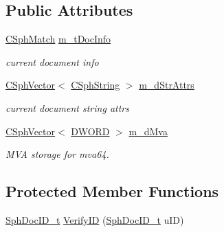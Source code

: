 \subsection*{Public Attributes}
\begin{DoxyCompactItemize}
\item 
\hyperlink{classCSphMatch}{C\-Sph\-Match} \hyperlink{classCSphSource_a78d0c67d1455c1a49267f79ab36a2d31}{m\-\_\-t\-Doc\-Info}
\begin{DoxyCompactList}\small\item\em current document info \end{DoxyCompactList}\item 
\hyperlink{classCSphVector}{C\-Sph\-Vector}$<$ \hyperlink{structCSphString}{C\-Sph\-String} $>$ \hyperlink{classCSphSource_ab504e862bb01cd4e5e755f2713a14234}{m\-\_\-d\-Str\-Attrs}
\begin{DoxyCompactList}\small\item\em current document string attrs \end{DoxyCompactList}\item 
\hyperlink{classCSphVector}{C\-Sph\-Vector}$<$ \hyperlink{sphinxstd_8h_a798af1e30bc65f319c1a246cecf59e39}{D\-W\-O\-R\-D} $>$ \hyperlink{classCSphSource_a15249c45e1ca278d76525e2a0d8c828c}{m\-\_\-d\-Mva}
\begin{DoxyCompactList}\small\item\em M\-V\-A storage for mva64. \end{DoxyCompactList}\end{DoxyCompactItemize}
\subsection*{Protected Member Functions}
\begin{DoxyCompactItemize}
\item 
\hyperlink{sphinx_8h_a3176771631c12a9e4897272003e6b447}{Sph\-Doc\-I\-D\-\_\-t} \hyperlink{classCSphSource_a2f3e7e13d9d8fd7833e0a81bcf2e389e}{Verify\-I\-D} (\hyperlink{sphinx_8h_a3176771631c12a9e4897272003e6b447}{Sph\-Doc\-I\-D\-\_\-t} u\-I\-D)
\end{DoxyCompactItemize}
